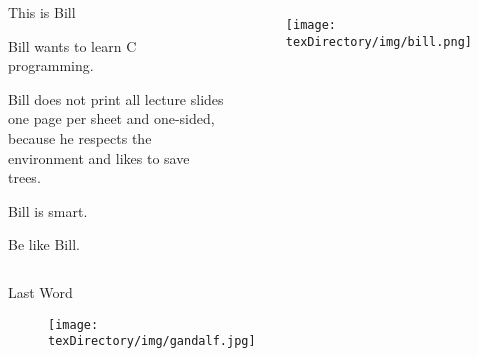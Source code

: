 \documentclass[compress]{beamer}
\begin{document}
\begin{slide}
	\begin{columns}
	\begin{block}{This is Bill}

	Bill wants to learn C programming.

	Bill does not print all lecture slides one page per sheet and one-sided, because he respects the environment and likes to save trees.

	Bill is smart.

	Be like Bill.

	\end{block}
	\begin{figure}
	\texttt{[image: \\texDirectory/img/bill.png]}
	\end{figure}
	\end{columns}
\end{slide}

\begin{slide}
	\begin{block}{Last Word}

	\begin{figure}
	\texttt{[image: \\texDirectory/img/gandalf.jpg]}
	\end{figure}

	\end{block}
\end{slide}
\end{document}

